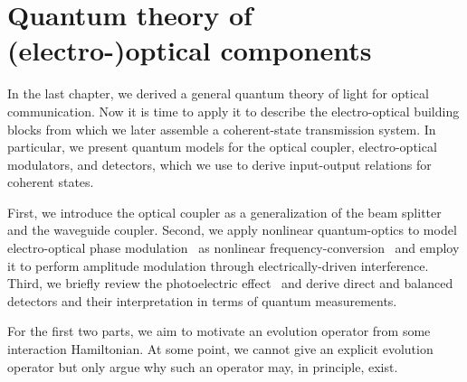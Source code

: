 \chapter{Quantum theory of (electro-)optical components}\label{ch:components}

In the last chapter, we derived a general quantum theory of light for optical communication.
Now it is time to apply it to describe the electro-optical building blocks from which we later assemble a coherent-state transmission system.
In particular, we present quantum models for the optical coupler, electro-optical modulators, and detectors, which we use to derive input-output relations for coherent states.

First, we introduce the optical coupler as a generalization of the beam splitter and the waveguide coupler.
Second, we apply nonlinear quantum-optics to model electro-optical phase modulation~\cite{Horoshko2018} as nonlinear frequency-conversion~\cite{QuesadaMejia2015} and employ it to perform amplitude modulation through electrically-driven interference.
Third, we briefly review the photoelectric effect~\cite{Mandel1995,Vogel2006} and derive direct and balanced detectors and their interpretation in terms of quantum measurements.

For the first two parts, we aim to motivate an evolution operator from some interaction Hamiltonian. 
At some point, we cannot give an explicit evolution operator but only argue why such an operator may, in principle, exist.